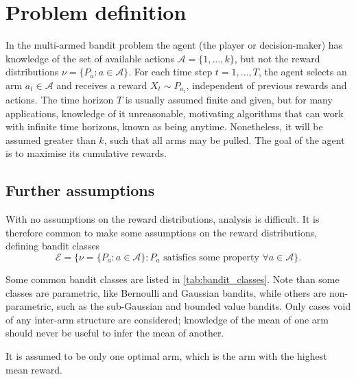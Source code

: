 \section{Problem definition}
In the multi-armed bandit problem the agent (the player or decision-maker) has knowledge of the set of available actions $\mathcal{A}=\{1, \dots, k\}$, but not the reward distributions $\nu = \{P_a : a \in \mathcal{A}\}$.
For each time step $t=1, \dots, T$, the agent selects an arm $a_t \in \mathcal{A}$ and receives a reward $X_t \sim P_{a_t}$, independent of previous rewards and actions.
The time horizon $T$ is usually assumed finite and given, but for many applications, knowledge of it unreasonable, motivating algorithms that can work with infinite time horizons, known as being anytime.
Nonetheless, it will be assumed greater than $k$, such that all arms may be pulled.
The goal of the agent is to maximise its cumulative rewards.

\subsection{Further assumptions}
With no assumptions on the reward distributions, analysis is difficult.
It is therefore common to make some assumptions on the reward distributions, defining bandit classes
\begin{equation}
    \mathcal{E} = \{\nu = \{P_a : a \in \mathcal{A}\} : P_a \text{ satisfies some property } \forall a \in \mathcal{A}\}.
\end{equation}

Some common bandit classes are listed in \cref{tab:bandit_classes}.
Note than some classes are parametric, like Bernoulli and Gaussian bandits, while others are non-parametric, such as the sub-Gaussian and bounded value bandits.
Only cases void of any inter-arm structure are considered; knowledge of the mean of one arm should never be useful to infer the mean of another.

It is assumed to be only one optimal arm, which is the arm with the highest mean reward.


